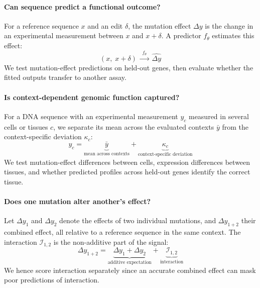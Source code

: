 \paragraph{ Can sequence predict a functional outcome?}
For a reference sequence $x$ and an edit $\delta$, the mutation
effect $\Delta y$ is the change in an experimental measurement between
$x$ and $x+\delta$. A predictor $f_\theta$ estimates this effect:
\begin{equation}
    (x,\;x+\delta)
    \;\xrightarrow{\;f_\theta\;}\;
    \widehat{\Delta y}
    \label{eq:functional-prediction}
\end{equation}
We test mutation-effect predictions on held-out genes, then evaluate whether the fitted outputs transfer to another assay. %

\paragraph{ Is context-dependent genomic function captured?} %
For a DNA sequence with an experimental measurement $y_c$ measured in several cells or tissues $c$, we separate its mean across the evaluated contexts $\bar y$ from the context-specific deviation $\kappa_c$:
\begin{equation}
    y_c
    =
    \underbrace{\bar y}_{\text{mean across contexts}}
    +
    \underbrace{\kappa_c}_{\text{context-specific deviation}}
    \label{eq:context}
\end{equation}
We test mutation-effect differences between cells, expression differences between
tissues, and whether predicted profiles across held-out genes identify
the correct tissue.


\paragraph{ Does one mutation alter another's effect?}
Let $\Delta y_1$ and $\Delta y_2$ denote the effects of two
individual mutations, and $\Delta y_{1+2}$ their combined effect,
all relative to a reference sequence in the same context.
The interaction $\mathcal I_{1,2}$ is the non-additive part of the signal:
\begin{equation}
    \Delta y_{1+2}
    =
    \underbrace{\Delta y_1+\Delta y_2}_{\text{additive expectation}}
    +
    \underbrace{\mathcal I_{1,2}}_{\text{interaction}}
    \label{eq:compose}
\end{equation}
We hence score interaction separately since an accurate combined effect can
mask poor predictions of interaction. 

